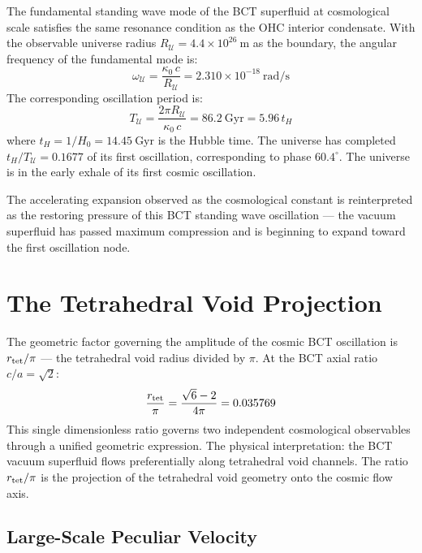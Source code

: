 \documentclass[aps,prl,twocolumn,showpacs,superscriptaddress]{revtex4-2}
\begin{document}
The fundamental standing wave mode of the BCT superfluid at cosmological scale 
satisfies the same resonance condition as the OHC interior condensate. With the 
observable universe radius $R_{\mathcal{U}} = 4.4 \times 10^{26}~\text{m}$ as 
the boundary, the angular frequency of the fundamental mode is:
\begin{equation}
    \omega_{\mathcal{U}} = \frac{\kappa_0\, c}{R_{\mathcal{U}}}
    = 2.310 \times 10^{-18}~\text{rad/s}
\end{equation}
The corresponding oscillation period is:
\begin{equation}
    \boxed{T_{\mathcal{U}} = \frac{2\pi R_{\mathcal{U}}}{\kappa_0\, c} 
    = 86.2~\text{Gyr} = 5.96\,t_H}
\end{equation}
where $t_H = 1/H_0 = 14.45~\text{Gyr}$ is the Hubble time. The universe has 
completed $t_H/T_{\mathcal{U}} = 0.1677$ of its first oscillation, 
corresponding to phase $60.4^\circ$. The universe is in the early exhale of 
its first cosmic oscillation.

The accelerating expansion observed as the cosmological constant is reinterpreted 
as the restoring pressure of this BCT standing wave oscillation --- the vacuum 
superfluid has passed maximum compression and is beginning to expand toward the 
first oscillation node.

\section{The Tetrahedral Void Projection}

The geometric factor governing the amplitude of the cosmic BCT oscillation is 
$r_{\rm tet}/\pi$ --- the tetrahedral void radius divided by $\pi$. At the BCT 
axial ratio $c/a = \sqrt{2}$:
\begin{equation}
    \frac{r_{\rm tet}}{\pi} = \frac{\sqrt{6}-2}{4\pi} = 0.035769
\end{equation}
This single dimensionless ratio governs two independent cosmological observables 
through a unified geometric expression. The physical interpretation: the BCT 
vacuum superfluid flows preferentially along tetrahedral void channels. The 
ratio $r_{\rm tet}/\pi$ is the projection of the tetrahedral void geometry 
onto the cosmic flow axis.

\subsection{Large-Scale Peculiar Velocity}
\end{document}
